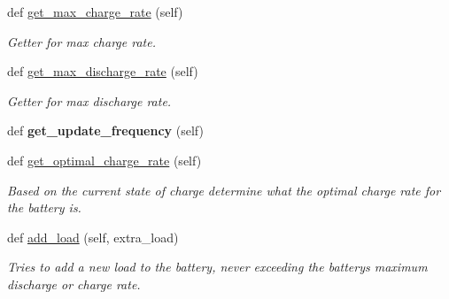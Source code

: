 \begin{DoxyCompactItemize}
\mbox{\label{class_build_1_1_objects_1_1battery_1_1_battery_ace39c87e0ab087c9f7d07c8a5f645fc4}} 
def \hyperlink{class_build_1_1_objects_1_1battery_1_1_battery_ace39c87e0ab087c9f7d07c8a5f645fc4}{get\+\_\+max\+\_\+charge\+\_\+rate} (self)
\begin{DoxyCompactList}\small\item\em Getter for max charge rate. \end{DoxyCompactList}\item 
\mbox{\label{class_build_1_1_objects_1_1battery_1_1_battery_a506889af4ebe7834352be77633a4a6f0}} 
def \hyperlink{class_build_1_1_objects_1_1battery_1_1_battery_a506889af4ebe7834352be77633a4a6f0}{get\+\_\+max\+\_\+discharge\+\_\+rate} (self)
\begin{DoxyCompactList}\small\item\em Getter for max discharge rate. \end{DoxyCompactList}\item 
\mbox{\label{class_build_1_1_objects_1_1battery_1_1_battery_a36c84b4ac8194d64a0a319b626514e0f}} 
def {\bfseries get\+\_\+update\+\_\+frequency} (self)
\item 
def \hyperlink{class_build_1_1_objects_1_1battery_1_1_battery_a8f464a9edbd9a2efbe609477d004ccb1}{get\+\_\+optimal\+\_\+charge\+\_\+rate} (self)
\begin{DoxyCompactList}\small\item\em Based on the current state of charge determine what the optimal charge rate for the battery is. \end{DoxyCompactList}\item 
def \hyperlink{class_build_1_1_objects_1_1battery_1_1_battery_a246c9aa9c3d54e71519b0a20a8ea350b}{add\+\_\+load} (self, extra\+\_\+load)
\begin{DoxyCompactList}\small\item\em Tries to add a new load to the battery, never exceeding the battery\textquotesingle{}s maximum discharge or charge rate. \end{DoxyCompactList}\item 
\mbox{\label{class_build_1_1_objects_1_1battery_1_1_battery_a1820a5bff8f3d5d46f8d32ff73e1006c}} 

\end{DoxyCompactItemize}
